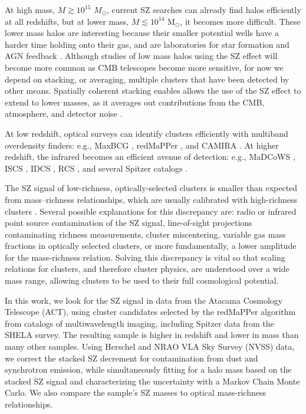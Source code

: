 \documentclass[a4paper,fleqn,usenatbib]{mnras}
\begin{document}
At high mass, $M \gtrsim 10^{15}$ $M_\odot$, current SZ searches can already find halos efficiently at all redshifts, but at lower mass, $M \lesssim 10^{14}$ M$_{\odot}$, it becomes more difficult. 
These lower mass halos are interesting because their smaller potential wells have a harder time holding onto their gas, and are laboratories for star formation and AGN feedback \citep{2011ApJ...736...39H, 2013ApJ...767...38S, 2013A&A...555A..66L, 2015MNRAS.448.2085L}.  
Although studies of low mass halos using the SZ effect will become more common as CMB telescopes become more sensitive, for now we depend on stacking, or averaging, multiple clusters that have been detected by other means.  
Spatially coherent stacking enables allows the use of the SZ effect to extend to lower masses, as it averages out contributions from the CMB, atmosphere, and detector noise \citep{2013ApJ...767...38S, 2011A&A...536A..12P, 2011ApJ...736...39H}.

At low redshift, optical surveys can identify clusters efficiently with multiband overdensity finders: e.g., MaxBCG \citep{2007ApJ...660..221K}, redMaPPer \citep{2014ApJ...785..104R}, and CAMIRA \citep{2014MNRAS.444..147O}.
At higher redshift, the infrared becomes an efficient avenue of detection: e.g., MaDCoWS \citep{2014ApJS..213...25S,2018arXiv180906820G}, ISCS 
\citep{2008ApJ...684..905E}, IDCS \citep{2012ApJ...753..164S}, RCS \citep{2000AJ....120.2148G}, and several Spitzer catalogs \citep{2008ApJ...676..206P, 2010ApJ...716.1503P}.

The SZ signal of low-richness, optically-selected clusters is smaller than expected from mass--richness relationships, which are usually calibrated with high-richness clusters \citep{2011A&A...536A..12P,2012PhRvD..85b3005D,2013ApJ...767...38S,2016arXiv160508770S}. 
Several possible explanations for this discrepancy are: radio or infrared point source contamination of the SZ signal, line-of-sight projections contaminating richness measurements, cluster miscentering, variable gas mass fractions in optically selected clusters, or more fundamentally, a lower amplitude for the mass-richness relation.
Solving this discrepancy is vital so that scaling relations for clusters, and therefore cluster physics, are understood over a wide mass range, allowing clusters to be used to their full cosmological potential.

In this work, we look for the SZ signal in data from the Atacama Cosmology Telescope (ACT), using cluster candidates selected by the redMaPPer algorithm from catalogs of multiwavelength imaging, including Spitzer data from the SHELA survey.
The resulting sample is higher in redshift and lower in mass than many other samples. 
Using Herschel and NRAO VLA Sky Survey (NVSS) data, we correct the stacked SZ decrement for contamination from dust and synchrotron emission, while simultaneously fitting for a halo mass based on the stacked SZ signal and characterizing the uncertainty with a Markov Chain Monte Carlo.
We also compare the sample's SZ masses to optical mass-richness relationships.
\end{document}
